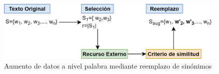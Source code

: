 \begin{figure}
    \includegraphics[width=\textwidth]{sections/figures/word_level.png}
    \caption{Aumento de datos a nivel palabra mediante reemplazo de sinónimos}
    \label{fig:aumento}
\end{figure}